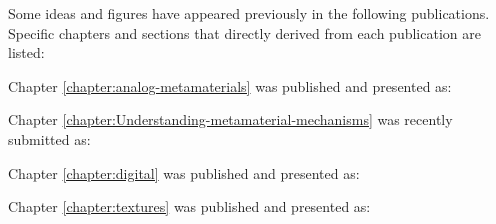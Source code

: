 
\noindent 
Some ideas and figures have appeared previously in the following publications. Specific chapters and sections that directly derived from each publication are listed:

Chapter \ref{chapter:analog-metamaterials} was published and presented as: 

Chapter \ref{chapter:Understanding-metamaterial-mechanisms} was recently submitted as: 

Chapter \ref{chapter:digital} was published and presented as: 

Chapter \ref{chapter:textures} was published and presented as: 




